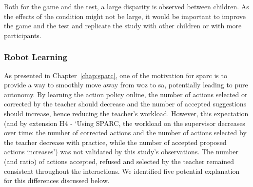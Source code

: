 Both for the game and the test, a large disparity is observed between children. As the effects of the condition might not be large, it would be important to improve the game and the test and replicate the study with other children or with more participants.



\subsubsection{Robot Learning} \label{sec:tutoring_disc_learning}
%
%

As presented in Chapter~\ref{chap:sparc}, one of the motivation for \gls{sparc} is to provide a way to smoothly move away from \gls{woz} to \gls{sa}, potentially leading to pure autonomy. By learning the action policy online, the number of actions selected or corrected by the teacher should decrease and the number of accepted suggestions should increase, hence reducing the teacher's workload. However, this expectation (and by extension H4 - `Using SPARC, the workload on the supervisor decreases over time: the number of corrected actions and the number of actions selected by the teacher decrease with practice, while the number of accepted proposed actions increases') was not validated by this study's observations. The number (and ratio) of actions accepted, refused and selected by the teacher remained consistent throughout the interactions. We identified five potential explanation for this differences discussed below.

